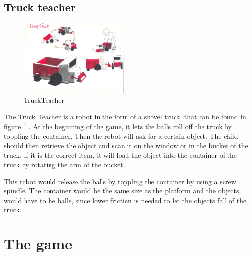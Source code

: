 \documentclass[11pt,twoside,a4paper]{report}
\begin{document}
\section{Truck teacher}
\begin{figure}
  \begin{center}
    \includegraphics[width=0.48\textwidth]{Images/TruckTeacherConcept.pdf}
  \end{center}
  \caption{TruckTeacher}
  \label{figure:truckteacher}
\end{figure}
The Truck Teacher is a robot in the form of a shovel truck, that can be found in figure \ref{figure:truckteacher} . At the beginning of the game, it lets the balls roll off the truck by toppling the container. Then the robot will ask for a certain object. The child should then retrieve the object and scan it on the window or in the bucket of the truck. If it is the correct item, it will load the object into the container of the truck by rotating the arm of the bucket.

This robot would release the balls by toppling the container by using a screw spindle. The container would be the same size as the platform and the objects would have to be balls, since lower friction is needed to let the objects fall of the truck.

\chapter{The game}
\label{chap:games}
\end{document}
